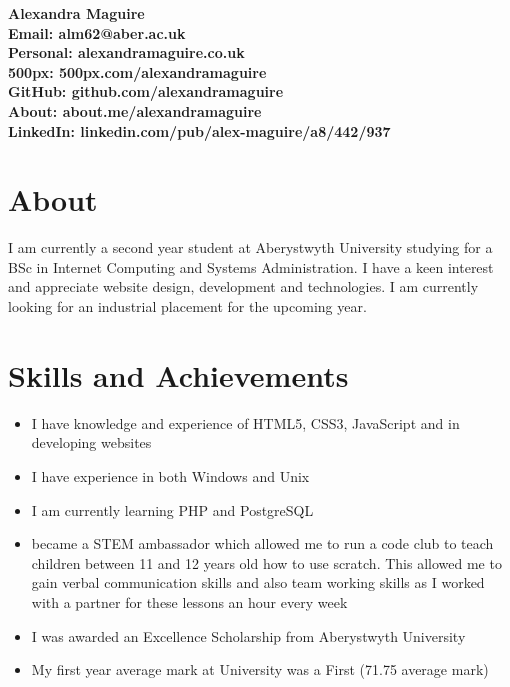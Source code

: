 \documentclass[a4paper,10pt]{article}
\begin{document}
\begin{center}
\bf{\Huge{Alexandra Maguire}} \\[0.5cm]
\large Email: alm62@aber.ac.uk \\
\large Personal: alexandramaguire.co.uk \\
\large 500px: 500px.com/alexandramaguire\\
\large GitHub: github.com/alexandramaguire \\
\large About: about.me/alexandramaguire\\
\large LinkedIn: linkedin.com/pub/alex-maguire/a8/442/937\\[0.5cm]
\end{center}
\vspace{20pt}
\section*{About}
I am currently a second year student at Aberystwyth University studying for a BSc in Internet Computing and Systems Administration. I have a keen interest and appreciate website design, development and technologies. I am currently looking for an industrial placement for the upcoming year.
\section*{Skills and Achievements}
\begin{itemize}
    \item I have knowledge and experience of HTML5, CSS3, JavaScript and in developing websites
    \item I have experience in both Windows and Unix
    \item I am currently learning PHP and PostgreSQL
    \item  became a STEM ambassador which allowed me to run a code club to teach children between 11 and 12 years old how to use scratch. This allowed me to gain verbal communication skills and also team working skills as I worked with a partner for these lessons an hour every week
     \item I was awarded an Excellence Scholarship from Aberystwyth University 
     \item My first year average mark at University was a First (71.75 average mark)
\end{itemize}
\end{document}
